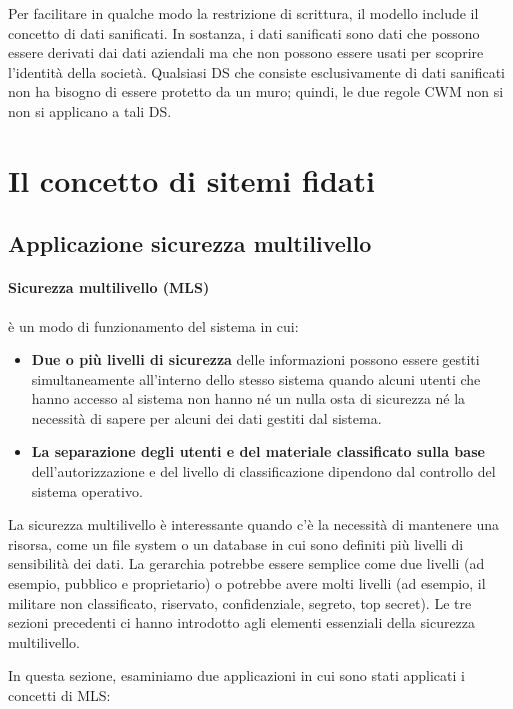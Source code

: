 \singlespacing

Per facilitare in qualche modo la restrizione di scrittura, il modello include il concetto di dati sanificati. In sostanza, i dati sanificati sono dati che possono essere derivati dai dati aziendali ma che non possono essere usati per scoprire l'identità della società. Qualsiasi DS che consiste esclusivamente di dati sanificati non ha bisogno di essere protetto da un muro; quindi, le due regole CWM non si non si applicano a tali DS.

\newpage
\section{Il concetto di sitemi fidati}
\subsection{Applicazione sicurezza multilivello}
\paragraph{Sicurezza multilivello (MLS)} è un modo di funzionamento del sistema in cui:

\begin{itemize}
    \item \textbf{Due o più livelli di sicurezza} delle informazioni possono essere gestiti simultaneamente all'interno dello stesso sistema quando alcuni utenti che hanno accesso al sistema non hanno né un nulla osta di sicurezza né la necessità di sapere per alcuni dei dati gestiti dal sistema.
    
    \item \textbf{La separazione degli utenti e del materiale classificato sulla base} dell'autorizzazione e del livello di classificazione dipendono dal controllo del sistema operativo.

\end{itemize}
La sicurezza multilivello è interessante quando c'è la necessità di mantenere una risorsa, come un file system o un database in cui sono definiti più livelli di sensibilità dei dati. La gerarchia potrebbe essere semplice come due livelli (ad esempio, pubblico e proprietario) o potrebbe avere molti livelli (ad esempio, il militare non classificato, riservato, confidenziale, segreto, top secret). Le tre sezioni precedenti ci hanno introdotto agli elementi essenziali della sicurezza multilivello. 

\singlespacing

In questa sezione, esaminiamo due applicazioni in cui sono stati applicati i concetti di MLS: 

